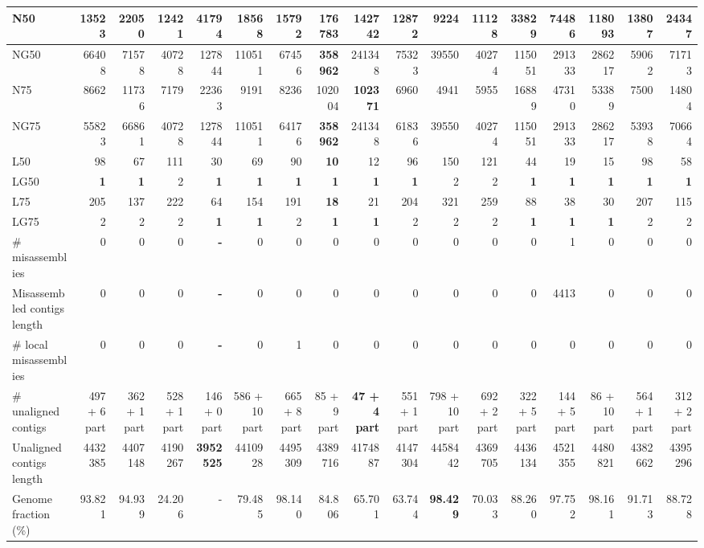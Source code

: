\documentclass[12pt,a4paper]{article}
\begin{document}
\begin{table}[ht]
\begin{center}
\begin{tabular}{|l*{16}{|r}|}
N50 & 13523 & 22050 & 12421 & 41794 & 18568 & 15792 & {\bf 176783} & 142742 & 12872 & 9224 & 11128 & 33829 & 74486 & 118093 & 13807 & 24347 \\ \hline
NG50 & 66408 & 71578 & 40728 & 127844 & 110511 & 67456 & {\bf 358962} & 241348 & 75323 & 39550 & 40274 & 115051 & 291333 & 286217 & 59062 & 71713 \\ \hline
N75 & 8662 & 11736 & 7179 & 22363 & 9191 & 8236 & 102004 & {\bf 102371} & 6960 & 4941 & 5955 & 16889 & 47310 & 53389 & 7500 & 14804 \\ \hline
NG75 & 55823 & 66861 & 40728 & 127844 & 110511 & 64176 & {\bf 358962} & 241348 & 61836 & 39550 & 40274 & 115051 & 291333 & 286217 & 53938 & 70664 \\ \hline
L50 & 98 & 67 & 111 & 30 & 69 & 90 & {\bf 10} & 12 & 96 & 150 & 121 & 44 & 19 & 15 & 98 & 58 \\ \hline
LG50 & {\bf 1} & {\bf 1} & 2 & {\bf 1} & {\bf 1} & {\bf 1} & {\bf 1} & {\bf 1} & {\bf 1} & 2 & 2 & {\bf 1} & {\bf 1} & {\bf 1} & {\bf 1} & {\bf 1} \\ \hline
L75 & 205 & 137 & 222 & 64 & 154 & 191 & {\bf 18} & 21 & 204 & 321 & 259 & 88 & 38 & 30 & 207 & 115 \\ \hline
LG75 & 2 & 2 & 2 & {\bf 1} & {\bf 1} & 2 & {\bf 1} & {\bf 1} & 2 & 2 & 2 & {\bf 1} & {\bf 1} & {\bf 1} & 2 & 2 \\ \hline
\# misassemblies & 0 & 0 & 0 & {\bf -} & 0 & 0 & 0 & 0 & 0 & 0 & 0 & 0 & 1 & 0 & 0 & 0 \\ \hline
Misassembled contigs length & 0 & 0 & 0 & {\bf -} & 0 & 0 & 0 & 0 & 0 & 0 & 0 & 0 & 4413 & 0 & 0 & 0 \\ \hline
\# local misassemblies & 0 & 0 & 0 & {\bf -} & 0 & 1 & 0 & 0 & 0 & 0 & 0 & 0 & 0 & 0 & 0 & 0 \\ \hline
\# unaligned contigs & 497 + 6 part & 362 + 1 part & 528 + 1 part & 146 + 0 part & 586 + 10 part & 665 + 8 part & 85 + 9 part & {\bf 47 + 4 part} & 551 + 1 part & 798 + 10 part & 692 + 2 part & 322 + 5 part & 144 + 5 part & 86 + 10 part & 564 + 1 part & 312 + 2 part \\ \hline
Unaligned contigs length & 4432385 & 4407148 & 4190267 & {\bf 3952525} & 4410928 & 4495309 & 4389716 & 4174887 & 4147304 & 4458442 & 4369705 & 4436134 & 4521355 & 4480821 & 4382662 & 4395296 \\ \hline
Genome fraction (\%) & 93.821 & 94.939 & 24.206 & - & 79.485 & 98.140 & 84.806 & 65.701 & 63.744 & {\bf 98.429} & 70.033 & 88.260 & 97.752 & 98.161 & 91.713 & 88.728 \\ \hline

\end{tabular}
\end{center}
\end{table}
\end{document}
